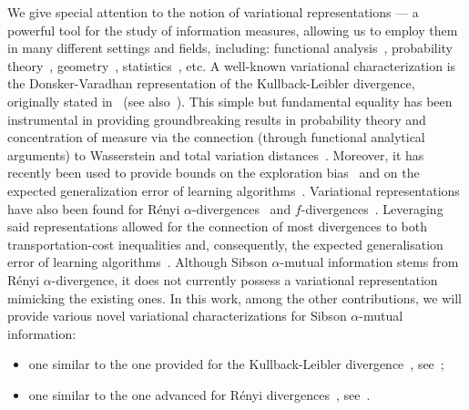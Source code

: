\documentclass{article}
\numberwithin{theorem}{section}
\numberwithin{example}{section}
\numberwithin{remark}{section}
\numberwithin{definition}{section}
\newcommand{\revised}[1]{{\color{black} #1}}
\begin{document}
We give special attention to the notion of variational representations --- a powerful tool for the study of information measures, allowing us to employ them in many different settings and fields, including: 
functional analysis~\cite{DonskerVaradhan:75,Varadhan:84,Liu:18,LiuCCPV:18,Raginsky:16,anantharam:18,LiuCCV:20,Esposito:22,KurriKS:22,EspositoG:22}, probability theory~\cite{sanov:58,Varadhan:84,Marton:96,Marton:96b,Marton:98,RaginskyS:14,EspositoGI:2021,EspositoWG:21, EspositoM:23,RaginskyS:14}, geometry~\cite{amari:2000}, statistics~\cite{GuoSV:05,XuR:17trans,XuR:22,EspositoVG:22,EspositoVG:23}, etc. 
\revised{A well-known variational characterization} is the Donsker-Varadhan representation of the Kullback-Leibler divergence, originally stated in~\cite{DonskerVaradhan:75} (see also~\cite[Section 10]{Varadhan:84}). This simple but fundamental equality has been instrumental in providing groundbreaking results in probability theory and concentration of measure via the connection (through functional analytical arguments) to Wasserstein and total variation  distances~\cite{Bobkov:99,Marton:86,Marton:96,Varadhan:84,Vershynin:18,RaginskyS:14,RassoulS:15}. Moreover, it has recently been used to provide bounds on the exploration bias~\cite{RussoZ:16} and on the expected generalization error of learning algorithms~\cite{XuR:17}. Variational representations have also been found for R\'enyi $\alpha$-divergences~\cite{atar:15,anantharam:18} and $f$-divergences~\cite{BroniatowskiK:10,NguyenWJ:08}. Leveraging said representations allowed for the connection of most divergences to both transportation-cost inequalities and, consequently, the expected generalisation error of learning algorithms~\cite{EspositoG:22, Esposito:22}. 
Although Sibson $\alpha$-mutual information stems from R\'enyi $\alpha$-divergence, it does not currently possess a variational representation mimicking the existing ones. In this work, among the other contributions, we will provide various novel variational characterizations for Sibson $\alpha$-mutual information: 
\begin{itemize}
    \item one similar to the one provided for the Kullback-Leibler divergence~\cite{renyiDiv}, see~;
    \item one similar to the one advanced for R\'enyi divergences~\cite{atar:15,anantharam:18}, see~.
\end{itemize}
\end{document}
